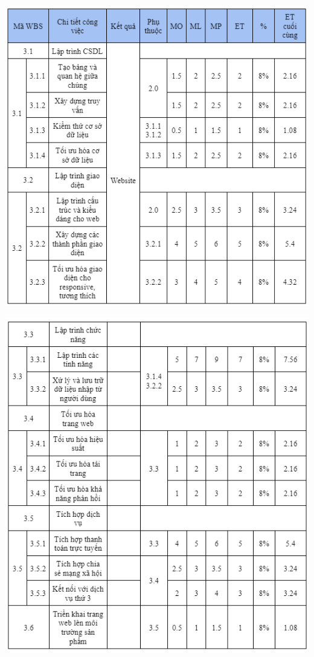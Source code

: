 \documentclass[12pt]{article}
\begin{document}
\includegraphics[width=14.5cm]{ThoiGian3_1.png}
\par
\includegraphics[width=14.5cm]{ThoiGian3_2.png}
\vspace{0.5cm}
\end{document}

